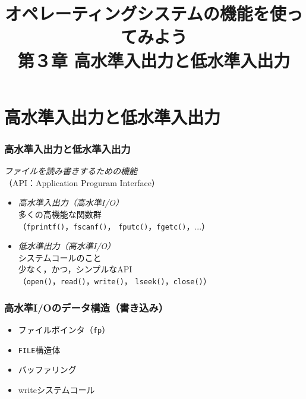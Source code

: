 \documentclass{beamer}                 %
\begin{document}
\title{オペレーティングシステムの機能を使ってみよう\\
第３章 高水準入出力と低水準入出力}
\date{}

\begin{frame}
  \titlepage
\end{frame}


\section{高水準入出力と低水準入出力}
\begin{frame}
  \frametitle{高水準入出力と低水準入出力}
  \emph{ファイルを読み書きするための機能} \\
  （API：Application Proguram Interface）
  \begin{itemize}
  \item \emph{高水準入出力（高水準I/O）} \\
    多くの高機能な関数群\\
    （\texttt{fprintf()}，\texttt{fscanf()}，
      \texttt{fputc()}，\texttt{fgetc()}，...）
  \item \emph{低水準出力（高水準I/O）} \\
    システムコールのこと \\
    少なく，かつ，シンプルなAPI \\
    （\texttt{open()}，\texttt{read()}，\texttt{write()}，
      \texttt{lseek()}，\texttt{close()}）
  \end{itemize}
\end{frame}

\begin{frame}
  \frametitle{高水準I/Oのデータ構造（書き込み）}
  \begin{itemize}
  \item ファイルポインタ（\texttt{fp}）
  \item \texttt{FILE}構造体
  \item バッファリング
  \item writeシステムコール
  \end{itemize}
\end{frame}
\end{document}
